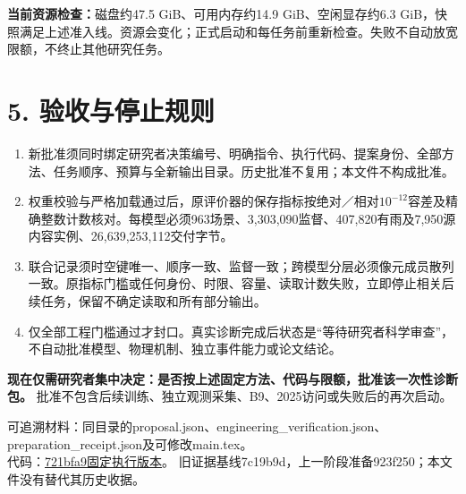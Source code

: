 \documentclass[UTF8,a4paper,10pt,fontset=none]{ctexart}
\newcommand{\key}[1]{\textcolor{ink}{\textbf{#1}}}
\begin{document}
\textbf{当前资源检查：}磁盘约47.5 GiB、可用内存约14.9 GiB、空闲显存约6.3 GiB，快照满足上述准入线。资源会变化；正式启动和每任务前重新检查。失败不自动放宽限额，不终止其他研究任务。

\section*{5. 验收与停止规则}
\begin{enumerate}
\item 新批准须同时绑定研究者决策编号、明确指令、执行代码、提案身份、全部方法、任务顺序、预算与全新输出目录。历史批准不复用；本文件不构成批准。
\item 权重校验与严格加载通过后，原评价器的保存指标按绝对／相对$10^{-12}$容差及精确整数计数核对。每模型必须963场景、3,303,090监督、407,820有雨及7,950源内容实例、26,639,253,112交付字节。
\item 联合记录须时空键唯一、顺序一致、监督一致；跨模型分层必须像元成员散列一致。原指标门槛或任何身份、时限、容量、读取计数失败，立即停止相关后续任务，保留不确定读取和所有部分输出。
\item 仅全部工程门槛通过才封口。真实诊断完成后状态是“等待研究者科学审查”，不自动批准模型、物理机制、独立事件能力或论文结论。
\end{enumerate}

\key{现在仅需研究者集中决定：是否按上述固定方法、代码与限额，批准该一次性诊断包。}
批准不包含后续训练、独立观测采集、B9、2025访问或失败后的再次启动。

{\footnotesize
可追溯材料：同目录的proposal.json、engineering\_verification.json、preparation\_receipt.json及可修改main.tex。\\
代码：\href{https://github.com/flyeagle-cex/YunTAPR-Net/commit/721bfa979a008e0fc2bbdf031a1888a502ceaca9}{721bfa9固定执行版本}。
旧证据基线7c19b9d，上一阶段准备923f250；本文件没有替代其历史收据。}
\end{document}
